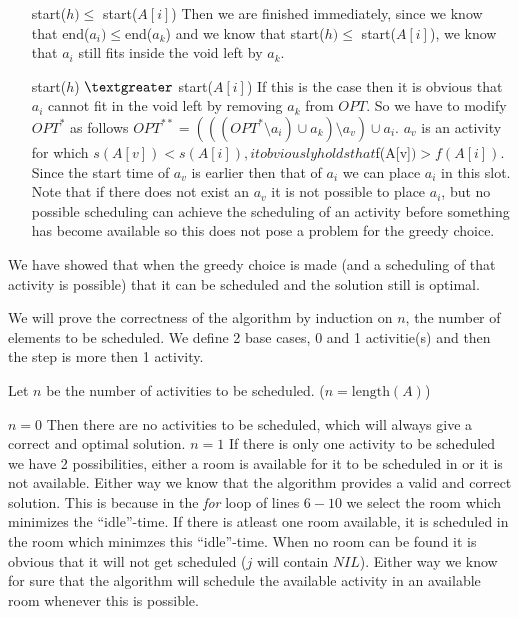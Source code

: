 \documentclass{article}
\newcommand{\blb}{]}
\begin{document}
\begin{itemize}
\begin{itemize}
\begin{itemize}
\begin{itemize}
\item[start($h) \le$ start($A[i\blb$)] Then we are finished immediately, since we know that end($a_i) \le $end($a_k$) and we know that start($h) \le$ start($A[i\blb$), we know that $a_i$ still fits inside the void left by $a_k$.
\item[start($h$) $\textgreater$ start($A[i\blb$)] If this is the case then it is obvious that $a_i$ cannot fit in the void left by removing $a_k$ from $OPT$. So we have to modify $OPT^*$ as follows $OPT^{**}=(((OPT^*\setminus a_i )\cup a_k) \setminus a_v) \cup a_i$. $a_v$ is an activity for which $s(A[v])<s(A[i]), it obviously holds that $f(A[v\blb$)>f(A[i])$. Since the start time of $a_v$ is earlier then that of $a_i$ we can place $a_i$ in this slot. Note that if there does not exist an $a_v$ it is not possible to place $a_i$, but no possible scheduling can achieve the scheduling of an activity before something has become available so this does not pose a problem for the greedy choice.
\end{itemize}


\end{itemize}
We have showed that when the greedy choice is made (and a scheduling of that activity is possible) that it can be scheduled and the solution still is optimal.


We will prove the correctness of the algorithm by induction on $n$, the number of elements to be scheduled. We define 2 base cases, 0 and 1 activitie(s) and then the step is more then 1 activity.

Let $n$ be the number of activities to be scheduled. ($n=(A)$)

\textbf{$n=0$} Then there are no activities to be scheduled, which will always give a correct and optimal solution.
\textbf{$n=1$} If there is only one activity to be scheduled we have 2 possibilities, either a room is available for it to be scheduled in or it is not available. Either way we know that the algorithm provides a valid and correct solution. This is because in the \emph{for} loop of lines $6-10$ we select the room which minimizes the ``idle''-time. If there is atleast one room available, it is scheduled in the room which minimzes this ``idle''-time. When no room can be found it is obvious that it will not get scheduled ($j$ will contain $NIL$). Either way we know for sure that the algorithm will schedule the available activity in an available room whenever this is possible.


\end{itemize}
\end{itemize}
\end{document}
